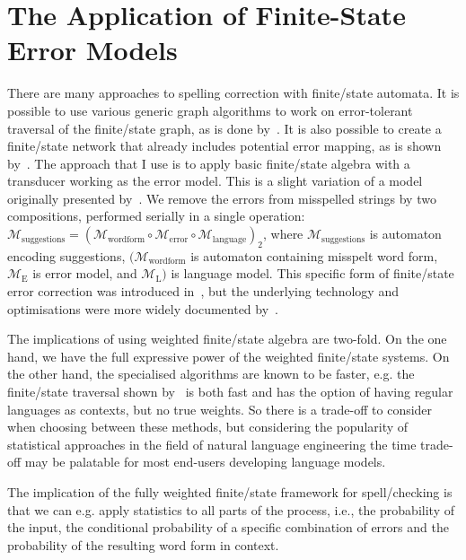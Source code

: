 \documentclass[officiallayout,final]{unihelcompling}
\begin{document}
\section{The Application of Finite-State Error Models}
\label{sec:error-application}

There are many approaches to spelling correction with finite\-/state automata.
It is possible to use various generic graph algorithms to work on
error-tolerant traversal of the finite\-/state graph, as is done
by~\citet{hulden2009fast}.  It is also possible to create a finite\-/state
network that already includes potential error mapping, as is shown
by~\citet{schulz2002fast}. The approach that I use is to apply basic
finite\-/state algebra with a transducer working as the error model. This is a
slight variation of a model originally presented by~\citet{mohri2003edit}. We
remove the errors from misspelled strings by two compositions, performed
serially in a single operation: $\mathcal{M}_{\mathrm{suggestions}} =
(\mathcal{M}_{\mathrm{word form}} \circ \mathcal{M}_{\mathrm{error}} \circ
\mathcal{M}_{\mathrm{language}})_2$, where $\mathcal{M}_{\mathrm{suggestions}}$
is automaton encoding suggestions, $(\mathcal{M}_{\mathrm{word form}}$ is
automaton containing misspelt word form, $\mathcal{M}_{\mathrm{E}}$ is error
model, and $\mathcal{M}_{\mathrm{L}})$ is language model. This specific form of
finite\-/state error correction was introduced
in~, but the underlying technology and
optimisations were more widely documented by~\citet{linden2011hfst}.

The implications of using weighted finite\-/state algebra are two-fold. On the
one hand, we have the full expressive power of the weighted finite\-/state
systems.  On the other hand, the specialised algorithms are known to be faster,
e.g.  the finite\-/state traversal shown by~\citet{hulden2009fast} is both fast
and has the option of having regular languages as contexts, but no true
weights.  So there is a trade-off to consider when choosing between these
methods, but considering the popularity of statistical approaches in the field
of natural language engineering the time trade-off may be palatable for most
end-users developing language models.

The implication of the fully weighted finite\-/state framework for
spell\-/checking is that we can e.g. apply statistics to all parts of the
process, i.e., the probability of the input, the conditional probability of a
specific combination of errors and the probability of the resulting word form
in context. 
\end{document}
